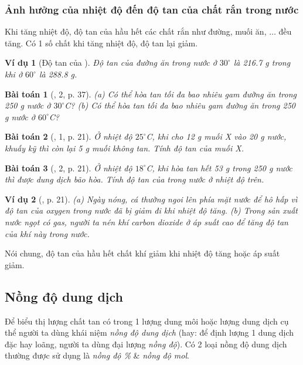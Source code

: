 \documentclass{article}
\newtheorem{baitoan}{Bài toán}
\newtheorem{vidu}{Ví dụ}
\begin{document}
\subsubsection{Ảnh hưởng của nhiệt độ đến độ tan của chất rắn trong nước}
Khi tăng nhiệt độ, độ tan của hầu hết các chất rắn như đường, muối ăn, $\ldots$ đều tăng. Có 1 số chất khi tăng nhiệt độ, độ tan lại giảm.

\begin{vidu}[Độ tan của ]
	Độ tan của đường ăn trong nước ở $30^\circ$ là \emph{216.7 g} trong khi ở $60^\circ$ là \emph{288.8 g}.
\end{vidu}

\begin{baitoan}[\cite{SGK_KHTN_8_Canh_Dieu}, 2, p. 37]
	(a) Có thể hòa tan tối đa bao nhiêu gam đường ăn trong \emph{250 g} nước ở $30^\circ$\emph{C}? (b) Có thể hòa tan tối đa bao nhiêu gam đường ăn trong \emph{250 g} nước ở $60^\circ$\emph{C}?
\end{baitoan}

\begin{baitoan}[\cite{SGK_KHTN_8_KNTTVCS}, 1, p. 21]
	Ở nhiệt độ $25^\circ$\emph{C}, khi cho \emph{12 g} muối X vào \emph{20 g} nước, khuấy kỹ thì còn lại \emph{5 g} muối không tan. Tính độ tan của muối X.
\end{baitoan}

\begin{baitoan}[\cite{SGK_KHTN_8_KNTTVCS}, 2, p. 21]
	Ở nhiệt độ $18^\circ$\emph{C}, khi hòa tan hết \emph{53 g} \emph{} trong \emph{250 g} nước thì được dung dịch bão hòa. Tính độ tan của \emph{} trong nước ở nhiệt độ trên.
\end{baitoan}

\begin{vidu}[\cite{SGK_KHTN_8_KNTTVCS}, p. 21]
	(a) Ngày nóng, cá thường ngoi lên phía mặt nước để hô hấp vì độ tan của oxygen trong nước đã bị giảm đi khi nhiệt độ tăng. (b) Trong sản xuất nước ngọt có gas, người ta nén khí carbon dioxide ở áp suất cao để tăng độ tan của khí này trong nước.
\end{vidu}
Nói chung, độ tan của hầu hết chất khí giảm khi nhiệt độ tăng hoặc áp suất giảm.

\subsection{Nồng độ dung dịch}
Để biểu thị lượng chất tan có trong 1 lượng dung môi hoặc lượng dung dịch cụ thể người ta dùng khái niệm \textit{nồng độ dung dịch} (hay: để định lượng 1 dung dịch đặc hay loãng, người ta dùng đại lượng \textit{nồng độ}). Có 2 loại nồng độ dung dịch thường được sử dụng là \textit{nồng độ \%} \& \textit{nồng độ mol}.
\end{document}
